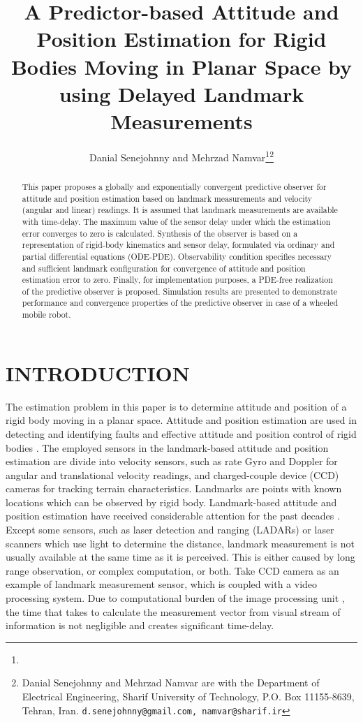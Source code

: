 \documentclass[12pt,draftcls,onecolumn]{IEEEtran}
\title{\LARGE \bf
A Predictor-based Attitude and Position Estimation for Rigid Bodies Moving in Planar Space by using Delayed Landmark Measurements
}
\author{Danial Senejohnny  and Mehrzad Namvar\thanks{}\thanks{Danial Senejohnny and Mehrzad Namvar are with the Department of Electrical Engineering, Sharif University of Technology, P.O. Box 11155-8639, Tehran, Iran. {\tt\small d.senejohnny@gmail.com, namvar@sharif.ir}}}
\begin{document}
\maketitle
\thispagestyle{empty}
\pagestyle{empty}


\begin{abstract}

This paper proposes a globally and exponentially convergent predictive observer for attitude and position estimation based on landmark measurements and velocity (angular and linear) readings. It is assumed that landmark measurements are available with time-delay. The maximum value of the sensor delay under which the estimation error converges to zero is calculated. Synthesis of the observer is based on a representation of rigid-body kinematics and sensor delay, formulated via ordinary and partial differential equations (ODE-PDE). Observability condition specifies necessary and sufficient landmark configuration for convergence of attitude and position estimation error to zero.  Finally, for implementation purposes, a PDE-free realization of the predictive observer is proposed. Simulation results are presented to demonstrate performance and convergence properties of the predictive observer in case of a wheeled mobile robot.

\end{abstract}


\section{INTRODUCTION}

The estimation problem in this paper is to determine attitude and position of a rigid body moving in a planar space. Attitude and position estimation are used in detecting and identifying faults \cite{c1} and effective attitude and position control of rigid bodies \cite{c2,c3}. The employed sensors in the landmark-based attitude and position estimation are divide into velocity sensors, such as rate Gyro and Doppler for angular and translational velocity readings, and charged-couple device (CCD) cameras for tracking terrain characteristics. Landmarks are points with known locations which can be observed by rigid body. Landmark-based attitude and position estimation have received considerable attention for the past decades \cite{c4,c5}. Except some sensors, such as laser detection and ranging (LADARs) or laser scanners which use light to determine the distance, landmark measurement is not usually available at the same time as it is perceived. This is either caused by long range observation, or complex computation, or both. Take CCD camera as an example of landmark measurement sensor, which is coupled with a video processing system. Due to computational burden of the image processing unit \cite{c6}, the time that takes to calculate the measurement vector from visual stream of information is not negligible and creates significant time-delay.
\end{document}
